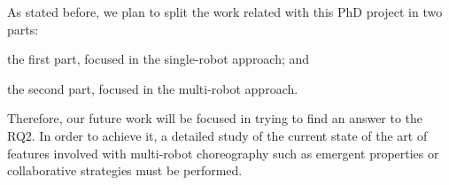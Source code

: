 As stated before, we plan to split the work related with this PhD project in two parts: 
\begin{enumerate*}
\item the first part, focused in the single-robot approach; and
\item the second part, focused in the multi-robot approach.
\end{enumerate*}

Therefore, our future work will be focused in trying to find an answer to the RQ2.
In order to achieve it, a detailed study of the current state of the art of features involved with multi-robot choreography such as emergent properties or collaborative strategies must be performed.